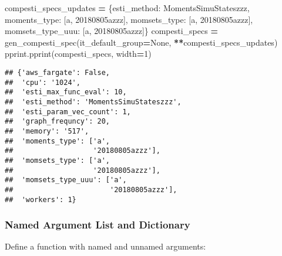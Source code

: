 \documentclass[
]{book}
\newenvironment{Shaded}{\begin{snugshade}}{\end{snugshade}}
\newcommand{\DecValTok}[1]{\textcolor[rgb]{0.00,0.00,0.81}{#1}}
\newcommand{\NormalTok}[1]{#1}
\newcommand{\OperatorTok}[1]{\textcolor[rgb]{0.81,0.36,0.00}{\textbf{#1}}}
\newcommand{\StringTok}[1]{\textcolor[rgb]{0.31,0.60,0.02}{#1}}
\newcommand{\VariableTok}[1]{\textcolor[rgb]{0.00,0.00,0.00}{#1}}
\begin{document}
\begin{Shaded}
\begin{Highlighting}[]
\NormalTok{compesti\_specs\_updates }\OperatorTok{=}\NormalTok{ \{}\StringTok{\textquotesingle{}esti\_method\textquotesingle{}}\NormalTok{: }\StringTok{\textquotesingle{}MomentsSimuStateszzz\textquotesingle{}}\NormalTok{,}
                          \StringTok{\textquotesingle{}moments\_type\textquotesingle{}}\NormalTok{: [}\StringTok{\textquotesingle{}a\textquotesingle{}}\NormalTok{, }\StringTok{\textquotesingle{}20180805azzz\textquotesingle{}}\NormalTok{],}
                          \StringTok{\textquotesingle{}momsets\_type\textquotesingle{}}\NormalTok{: [}\StringTok{\textquotesingle{}a\textquotesingle{}}\NormalTok{, }\StringTok{\textquotesingle{}20180805azzz\textquotesingle{}}\NormalTok{],}
                          \StringTok{\textquotesingle{}momsets\_type\_uuu\textquotesingle{}}\NormalTok{: [}\StringTok{\textquotesingle{}a\textquotesingle{}}\NormalTok{, }\StringTok{\textquotesingle{}20180805azzz\textquotesingle{}}\NormalTok{]\}}
\NormalTok{compesti\_specs }\OperatorTok{=}\NormalTok{ gen\_compesti\_spec(it\_default\_group}\OperatorTok{=}\VariableTok{None}\NormalTok{, }\OperatorTok{**}\NormalTok{compesti\_specs\_updates)}
\NormalTok{pprint.pprint(compesti\_specs, width}\OperatorTok{=}\DecValTok{1}\NormalTok{)}
\end{Highlighting}
\end{Shaded}

\begin{verbatim}
## {'aws_fargate': False,
##  'cpu': '1024',
##  'esti_max_func_eval': 10,
##  'esti_method': 'MomentsSimuStateszzz',
##  'esti_param_vec_count': 1,
##  'graph_frequncy': 20,
##  'memory': '517',
##  'moments_type': ['a',
##                   '20180805azzz'],
##  'momsets_type': ['a',
##                   '20180805azzz'],
##  'momsets_type_uuu': ['a',
##                       '20180805azzz'],
##  'workers': 1}
\end{verbatim}

\hypertarget{named-argument-list-and-dictionary}{%
\subsubsection{Named Argument List and Dictionary}\label{named-argument-list-and-dictionary}}

Define a function with named and unnamed arguments:
\end{document}
